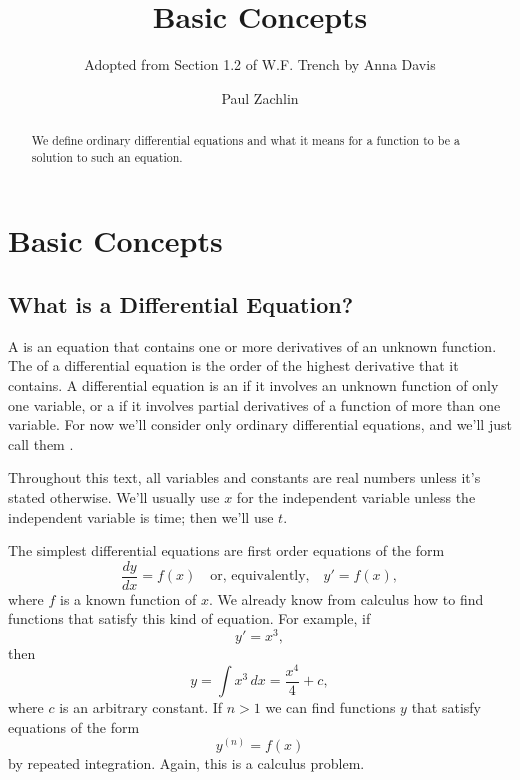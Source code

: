 \documentclass{ximera}
\title{Basic Concepts}
\author{Adopted from Section 1.2 of W.F. Trench by Anna Davis \and Paul Zachlin}
\begin{document}
\begin{abstract}
We define ordinary differential equations and what it means for a function to be a solution to such an equation.
\end{abstract}

\maketitle

\section*{Basic Concepts}
\subsection*{What is a Differential Equation?}
A  is an equation that contains one or more
derivatives of an unknown function. The  of a
differential equation is the order of the highest
derivative that it contains. A differential equation is an
 if it involves an unknown
function of only one variable, or a  if it involves partial derivatives of a function of more
than one variable. For now we'll consider only ordinary differential
equations, and we'll just call them .

Throughout this text, all variables and constants are real numbers unless it's
stated otherwise. We'll usually use $x$ for the independent variable
unless the independent variable is time; then we'll use $t$.

The simplest differential equations are first order equations of the
form
$$
\frac{dy}{dx}=f(x) \quad \text{or, equivalently,} \quad y'=f(x),
$$
where $f$  is a known function of $x$. We already know from calculus
how to find functions that satisfy this kind of equation. For example,
if
$$
y'=x^3,
$$
then
$$
y=\int x^3\, dx=\frac{x^4}{4}+c,
$$
 where $c$ is an arbitrary constant.  If $n>1$
we can find functions $y$ that satisfy
equations of the form
\begin{equation} \label{eq:1.2.1}
y^{(n)}=f(x)
\end{equation}
by repeated integration. Again, this is a calculus problem.
\end{document}
